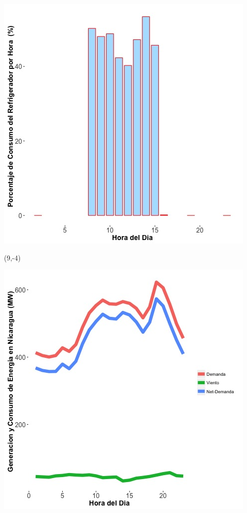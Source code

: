 \documentclass{article}\usepackage[]{graphicx}\usepackage[]{color}
\newenvironment{knitrout}{}{} %
\begin{document}
\begin{knitrout}
\color{fgcolor}
\includegraphics[scale=0.65]{figure/A6_fridge_energy_pct.jpg} 
\end{knitrout}

\begin{textblock}{1}(9,-4)
\begin{minipage}{20em}
\begingroup

\endgroup
\end{minipage}
\end{textblock}

\vspace{20cm}
 

\begin{knitrout}
\color{fgcolor}
\includegraphics[scale=0.65]{figure/gridplot1.jpg} 
\end{knitrout}
\end{document}
